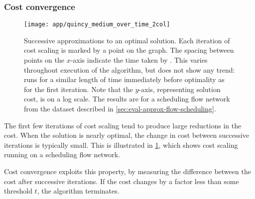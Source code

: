 %
%

\subsubsection{Cost convergence}

\begin{figure}
    \centering
    \texttt{[image: app/quincy\_medium\_over\_time\_2col]}
    \caption[Successive approximations to an optimal solution.]{Successive approximations to an optimal solution. Each iteration of cost scaling is marked by a point on the graph. The spacing between points on the $x$-axis indicate the time taken by . This varies throughout execution of the algorithm, but does not show any trend:  runs for a similar length of time immediately before optimality as for the first iteration. Note that the $y$-axis, representing solution cost, is on a log scale. The results are for a scheduling flow network from the dataset described in \cref{sec:eval-approx-flow-scheduling}.}
    \label{fig:app-cost-over-time}
\end{figure}

The first few iterations of cost scaling tend to produce large reductions in the cost. When the solution is nearly optimal, the change in cost between successive iterations is typically small. This is illustrated in \cref{fig:app-cost-over-time}, which shows cost scaling running on a scheduling flow network. 

Cost convergence exploits this property, by measuring the difference between the cost after successive iterations. If the cost changes by a factor less than some threshold $t$, the algorithm terminates.


